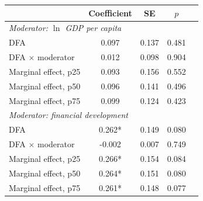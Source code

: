 \begin{tabular}{lcccc}
\toprule
 & Coefficient & SE & $p$ & \\
\midrule
\multicolumn{5}{l}{\textit{Moderator: $\ln$ GDP per capita}} \\
DFA & 0.097 & 0.137 & 0.481 & \\
DFA $\times$ moderator & 0.012 & 0.098 & 0.904 & \\
Marginal effect, p25 & 0.093 & 0.156 & 0.552 & \\
Marginal effect, p50 & 0.096 & 0.141 & 0.496 & \\
Marginal effect, p75 & 0.099 & 0.124 & 0.423 & \\
\midrule
\multicolumn{5}{l}{\textit{Moderator: financial development}} \\
DFA & 0.262* & 0.149 & 0.080 & \\
DFA $\times$ moderator & -0.002 & 0.007 & 0.749 & \\
Marginal effect, p25 & 0.266* & 0.154 & 0.084 & \\
Marginal effect, p50 & 0.264* & 0.151 & 0.080 & \\
Marginal effect, p75 & 0.261* & 0.148 & 0.077 & \\
\bottomrule
\end{tabular}